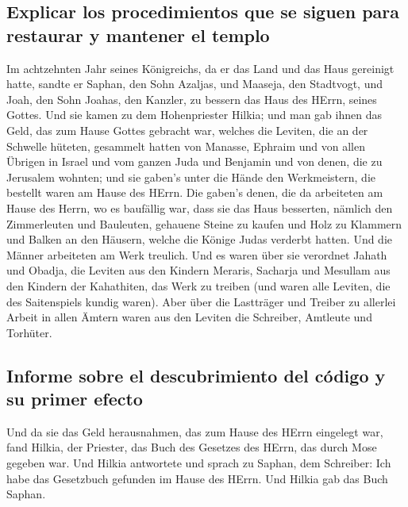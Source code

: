 \hypertarget{explicar-los-procedimientos-que-se-siguen-para-restaurar-y-mantener-el-templo}{%
\subsection{Explicar los procedimientos que se siguen para restaurar y
mantener el
templo}\label{explicar-los-procedimientos-que-se-siguen-para-restaurar-y-mantener-el-templo}}

 Im achtzehnten Jahr seines Königreichs, da er das Land
und das Haus gereinigt hatte, sandte er Saphan, den Sohn Azaljas, und
Maaseja, den Stadtvogt, und Joah, den Sohn Joahas, den Kanzler, zu
bessern das Haus des HErrn, seines Gottes.  Und sie kamen
zu dem Hohenpriester Hilkia; und man gab ihnen das Geld, das zum Hause
Gottes gebracht war, welches die Leviten, die an der Schwelle hüteten,
gesammelt hatten von Manasse, Ephraim und von allen Übrigen in Israel
und vom ganzen Juda und Benjamin und von denen, die zu Jerusalem
wohnten;  und sie gaben's unter die Hände den
Werkmeistern, die bestellt waren am Hause des HErrn. Die gaben's denen,
die da arbeiteten am Hause des Herrn, wo es baufällig war, dass sie das
Haus besserten,  nämlich den Zimmerleuten und Bauleuten,
gehauene Steine zu kaufen und Holz zu Klammern und Balken an den
Häusern, welche die Könige Judas verderbt hatten.  Und
die Männer arbeiteten am Werk treulich. Und es waren über sie verordnet
Jahath und Obadja, die Leviten aus den Kindern Meraris, Sacharja und
Mesullam aus den Kindern der Kahathiten, das Werk zu treiben (und waren
alle Leviten, die des Saitenspiels kundig waren).  Aber
über die Lastträger und Treiber zu allerlei Arbeit in allen Ämtern waren
aus den Leviten die Schreiber, Amtleute und Torhüter.

\hypertarget{informe-sobre-el-descubrimiento-del-cuxf3digo-y-su-primer-efecto}{%
\subsection{Informe sobre el descubrimiento del código y su primer
efecto}\label{informe-sobre-el-descubrimiento-del-cuxf3digo-y-su-primer-efecto}}

 Und da sie das Geld herausnahmen, das zum Hause des
HErrn eingelegt war, fand Hilkia, der Priester, das Buch des Gesetzes
des HErrn, das durch Mose gegeben war.  Und Hilkia
antwortete und sprach zu Saphan, dem Schreiber: Ich habe das Gesetzbuch
gefunden im Hause des HErrn. Und Hilkia gab das Buch Saphan.

